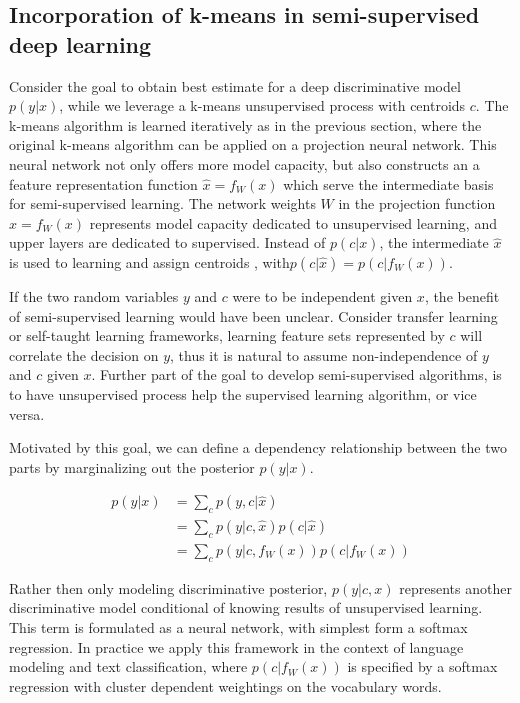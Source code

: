 \documentclass{article}
\begin{document}
\subsection{Incorporation of k-means in semi-supervised deep learning} 
Consider the goal to obtain best estimate for a deep discriminative model $p(y | x)$, while
we leverage a k-means unsupervised process with centroids $c$. The k-means algorithm is learned iteratively 
as in the previous section, where the original k-means algorithm can be applied on a projection neural network. This neural network not only offers more model capacity, but also 
constructs an a feature representation function $\hat{x} = f_W(x)$ which serve the intermediate basis 
for semi-supervised learning. The network weights $W$ in the projection function $\hat{x} = f_W(x) $ represents model capacity dedicated to unsupervised learning, and 
upper layers are dedicated to supervised. Instead of $p(c | x)$, the intermediate $\hat{x}$ is used to 
learning and assign centroids , with$p(c | \hat{x}) = p (c | f_W(x)) $. 

If the two random variables $y$ and $c$ were to be independent given $x$, the benefit 
of semi-supervised learning would have been unclear. Consider transfer learning or self-taught learning frameworks, learning feature sets represented by $c$ will correlate the decision on $y$, thus it is natural to assume non-independence of $y$ and $c$ given $x$. Further part of the goal to develop semi-supervised algorithms, is to have unsupervised process 
help the supervised learning algorithm, or vice versa. 

Motivated by this goal,  we can define a dependency relationship between the two parts by marginalizing out the posterior $p(y | x)$. 

\begin{align}
\label{y_c_depend_equation}
p(y | x) &= \sum_c p(y, c | \hat{x}) \\
	    &= \sum_c p(y | c, \hat{x}) p(c | \hat{x}) \\ 
	    &= \sum_c p(y | c, f_W(x)) p(c | f_W(x)) 
\end{align} 

Rather then only modeling discriminative posterior, $p(y | c, x)$ represents another discriminative model conditional of knowing results of unsupervised learning. 
This term is formulated as a neural network, with simplest form a softmax regression. In practice we apply this framework in the context of language modeling and text classification, where $p(c | f_W(x))$ is specified by a softmax regression with cluster dependent weightings on the vocabulary words. 
\end{document}
